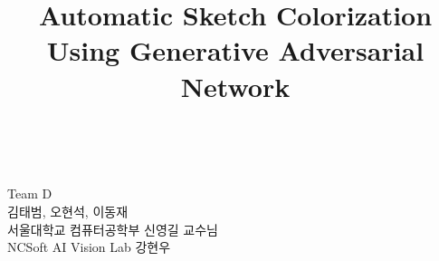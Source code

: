 \documentclass[11pt]{article}
\title{Automatic Sketch Colorization\\
	\Large Using Generative Adversarial Network}
\makeatletter
\let\thetitle\@title
\makeatother
\begin{document}

\begin{titlepage}
	\centering
	\vspace*{0.0cm}			%
	\textsc{ \Huge \bfseries \thetitle}\\
	\vspace*{12.0cm}
	
	\begin{minipage}{0.9\textwidth}
		\begin{flushright} \large
			Team D \\
			김태범, 오현석, 이동재 \\
			서울대학교 컴퓨터공학부 신영길 교수님\\
			NCSoft AI Vision Lab 강현우
		\end{flushright}
		
	\end{minipage}\\[2 cm]
\end{titlepage}


\pagebreak


\tableofcontents

\pagebreak














{\small


}
\end{document}

